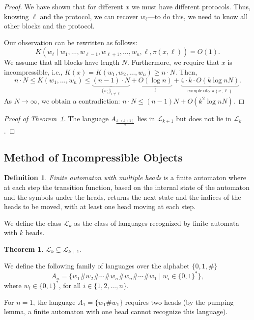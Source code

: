 \documentclass[12pt,sans]{article}
\newcommand{\bits}{\{0,1\}}
\newcommand{\bitstr}{\bits^*}
\theoremstyle{definition}
\newtheorem{definition}{Definition}[section]
\theoremstyle{plain}
\newtheorem{theorem}{Theorem}[section]
\theoremstyle{remark}
\begin{document}
\begin{proof}
    We have shown that for different $x$ we must have different protocols. Thus, knowing $\ell$ and the protocol, we can recover $w_\ell$—to do this, we need to know all other blocks and the protocol.

    Our observation can be rewritten as follows:
    \[
    K(w_\ell \mid w_1,\dots,w_{\ell-1},w_{\ell+1},\dotsc,w_n,\ell,\pi(x,\ell)) = O(1).
    \]
    We assume that all blocks have length $N$. Furthermore, we require that $x$ is incompressible, i.e., $K(x) = K(w_1,w_2,\dotsc,w_n) \ge n \cdot N$.
    Then,
    \[
    n \cdot N \le K(w_1,\dotsc,w_n) \le
    \underbrace{(n-1) \cdot N}_{\{w_i\}_{i \neq \ell}} +
    \underbrace{O(\log n)}_{\ell} +
    \underbrace{4 \cdot k \cdot O(k \log n N)}_{\text{complexity}\ \pi(x,\ell)}.
    \]
    As $N \to \infty$, we obtain a contradiction: $n \cdot N \le (n-1)N + O(k^2 \log n N)$.
\end{proof}

\begin{proof}[Proof of Theorem~\ref{thm:kDFA}]
    The language $A_{\frac{k \cdot (k + 1)}{2}}$ lies in $\mathcal{L}_{k+1}$ but does not lie in $\mathcal{L}_k$.
\end{proof}

\subsection{Method of Incompressible Objects}
\begin{definition}
    \emph{Finite automaton with multiple heads} is a finite automaton where at each step the transition function, based on the internal state of the automaton and the symbols under the heads, returns the next state and the indices of the heads to be moved, with at least one head moving at each step.
\end{definition}

We define the class $\mathcal{L}_k$ as the class of languages recognized by finite automata with $k$ heads.

\begin{theorem}\label{thm:kDFA}
    $\mathcal{L}_k \subsetneq \mathcal{L}_{k+1}$.
\end{theorem}

We define the following family of languages over the alphabet $\{0,1,\#\}$
\[
A_n = \{w_1\#w_2\#\dotsb\#w_n\#w_n\#\dotsb\#w_1 \mid w_i \in \bitstr\},
\]
where $w_i \in \bitstr$, for all $i \in \{1,2,\dotsc,n\}$.

For $n = 1$, the language $A_1 = \{w_1\#w_1\}$ requires two heads (by the pumping lemma, a finite automaton with one head cannot recognize this language).
\end{document}

